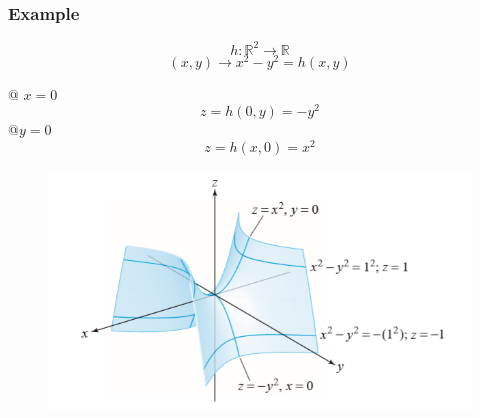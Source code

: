 \documentclass{article}
\begin{document}
\subsubsection*{Example}

\[h:\mathbb{R}^2\rightarrow\mathbb{R}\]
\[(x,y)\rightarrow x^{2}-y^{2}=h(x,y)\]

@ $x=0$
\[z=h(0,y)=-y^2\]
@$y=0$
\[z=h(x,0)=x^2\]


\begin{figure}[h!]
    \centering
    \includegraphics[scale=.5]{hyperbolicParabaloid.png}
    \label{}
\end{figure}
\end{document}
